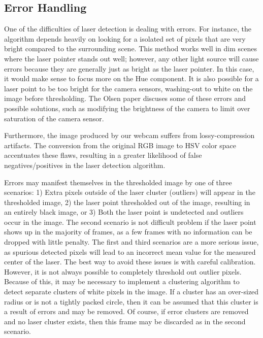 \documentclass[10pt,twocolumn,letterpaper]{article}
\begin{document}
\subsection{Error Handling}

One of the difficulties of laser detection is dealing with errors. For instance, the algorithm depends heavily on looking for a isolated set of pixels that are very bright compared to the surrounding scene. This method works well in dim scenes where the laser pointer stands out well; however, any other light source will cause errors because they are generally just as bright as the laser pointer. In this case, it would make sense to focus more on the Hue component. It is also possible for a laser point to be too bright for the camera sensors, washing-out to white on the image before thresholding. The Olsen paper \cite{olsen01laser} discuses some of these errors and possible solutions, such as modifying the brightness of the camera to limit over saturation of the camera sensor.

Furthermore, the image produced by our webcam suffers from lossy-compression artifacts.  The conversion from the original RGB image to HSV color space accentuates these flaws, resulting in a greater likelihood of false negatives/positives in the laser detection algorithm.

Errors may manifest themselves in the thresholded image by one of three scenarios: 1) Extra pixels outside of the laser cluster (outliers) will appear in the thresholded image, 2) the laser point thresholded out of the image, resulting in an entirely black image, or 3) Both the laser point is undetected and outliers occur in the image.  The second scenario is not difficult problem if the laser point shows up in the majority of frames, as a few frames with no information can be dropped with little penalty.  The first and third scenarios are a more serious issue, as spurious detected pixels will lead to an incorrect mean value for the measured center of the laser.  The best way to avoid these issues is with careful calibration.  However, it is not always possible to completely threshold out outlier pixels.  Because of this, it may be necessary to implement a clustering algorithm to detect separate clusters of white pixels in the image.  If a cluster has an over-sized radius or is not a tightly packed circle, then it can be assumed that this cluster is a result of errors and may be removed.  Of course, if error clusters are removed and no laser cluster exists, then this frame may be discarded as in the second scenario.
\end{document}
